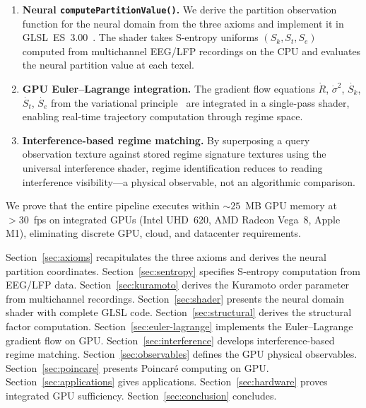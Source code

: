 \documentclass[11pt,twocolumn,a4paper]{article}
\newcommand{\Sk}{S_k}
\newcommand{\St}{S_t}
\newcommand{\Se}{S_e}
\begin{document}
\begin{enumerate}[leftmargin=*,itemsep=2pt]
\item \textbf{Neural \texttt{computePartitionValue()}.} We derive the partition observation function for the neural domain from the three axioms and implement it in GLSL~ES~3.00~\cite{khronos2023glsl}.
The shader takes S-entropy uniforms $(\Sk, \St, \Se)$ computed from multichannel EEG/LFP recordings on the CPU and evaluates the neural partition value at each texel.

\item \textbf{GPU Euler--Lagrange integration.} The gradient flow equations $\dot{R}$, $\dot{\sigma}^2$, $\dot{\Sk}$, $\dot{\St}$, $\dot{\Se}$ from the variational principle~\cite{sachikonye2026lagrangian} are integrated in a single-pass shader, enabling real-time trajectory computation through regime space.

\item \textbf{Interference-based regime matching.} By superposing a query observation texture against stored regime signature textures using the universal interference shader, regime identification reduces to reading interference visibility---a physical observable, not an algorithmic comparison.
\end{enumerate}

We prove that the entire pipeline executes within $\sim\!25$~MB GPU memory at $>30$~fps on integrated GPUs (Intel UHD~620, AMD Radeon Vega~8, Apple M1), eliminating discrete GPU, cloud, and datacenter requirements.

Section~\ref{sec:axioms} recapitulates the three axioms and derives the neural partition coordinates.
Section~\ref{sec:sentropy} specifies S-entropy computation from EEG/LFP data.
Section~\ref{sec:kuramoto} derives the Kuramoto order parameter from multichannel recordings.
Section~\ref{sec:shader} presents the neural domain shader with complete GLSL code.
Section~\ref{sec:structural} derives the structural factor computation.
Section~\ref{sec:euler-lagrange} implements the Euler--Lagrange gradient flow on GPU.
Section~\ref{sec:interference} develops interference-based regime matching.
Section~\ref{sec:observables} defines the GPU physical observables.
Section~\ref{sec:poincare} presents Poincar\'{e} computing on GPU.
Section~\ref{sec:applications} gives applications.
Section~\ref{sec:hardware} proves integrated GPU sufficiency.
Section~\ref{sec:conclusion} concludes.


\end{document}
